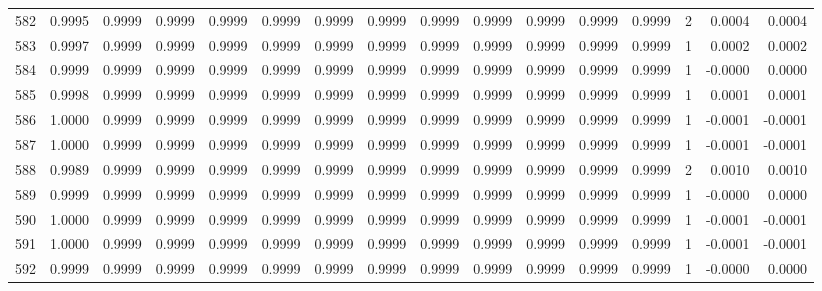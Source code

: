 \begin{tabular}{lrrrrrrrrrrrrrrr}
582 &      0.9995 &  0.9999 &  0.9999 &  0.9999 &  0.9999 &  0.9999 &  0.9999 &  0.9999 &  0.9999 &  0.9999 &   0.9999 &     0.9999 &      2 &                    0.0004 &                     0.0004 \\
583 &      0.9997 &  0.9999 &  0.9999 &  0.9999 &  0.9999 &  0.9999 &  0.9999 &  0.9999 &  0.9999 &  0.9999 &   0.9999 &     0.9999 &      1 &                    0.0002 &                     0.0002 \\
584 &      0.9999 &  0.9999 &  0.9999 &  0.9999 &  0.9999 &  0.9999 &  0.9999 &  0.9999 &  0.9999 &  0.9999 &   0.9999 &     0.9999 &      1 &                   -0.0000 &                     0.0000 \\
585 &      0.9998 &  0.9999 &  0.9999 &  0.9999 &  0.9999 &  0.9999 &  0.9999 &  0.9999 &  0.9999 &  0.9999 &   0.9999 &     0.9999 &      1 &                    0.0001 &                     0.0001 \\
586 &      1.0000 &  0.9999 &  0.9999 &  0.9999 &  0.9999 &  0.9999 &  0.9999 &  0.9999 &  0.9999 &  0.9999 &   0.9999 &     0.9999 &      1 &                   -0.0001 &                    -0.0001 \\
587 &      1.0000 &  0.9999 &  0.9999 &  0.9999 &  0.9999 &  0.9999 &  0.9999 &  0.9999 &  0.9999 &  0.9999 &   0.9999 &     0.9999 &      1 &                   -0.0001 &                    -0.0001 \\
588 &      0.9989 &  0.9999 &  0.9999 &  0.9999 &  0.9999 &  0.9999 &  0.9999 &  0.9999 &  0.9999 &  0.9999 &   0.9999 &     0.9999 &      2 &                    0.0010 &                     0.0010 \\
589 &      0.9999 &  0.9999 &  0.9999 &  0.9999 &  0.9999 &  0.9999 &  0.9999 &  0.9999 &  0.9999 &  0.9999 &   0.9999 &     0.9999 &      1 &                   -0.0000 &                     0.0000 \\
590 &      1.0000 &  0.9999 &  0.9999 &  0.9999 &  0.9999 &  0.9999 &  0.9999 &  0.9999 &  0.9999 &  0.9999 &   0.9999 &     0.9999 &      1 &                   -0.0001 &                    -0.0001 \\
591 &      1.0000 &  0.9999 &  0.9999 &  0.9999 &  0.9999 &  0.9999 &  0.9999 &  0.9999 &  0.9999 &  0.9999 &   0.9999 &     0.9999 &      1 &                   -0.0001 &                    -0.0001 \\
592 &      0.9999 &  0.9999 &  0.9999 &  0.9999 &  0.9999 &  0.9999 &  0.9999 &  0.9999 &  0.9999 &  0.9999 &   0.9999 &     0.9999 &      1 &                   -0.0000 &                     0.0000 \\

\end{tabular}
